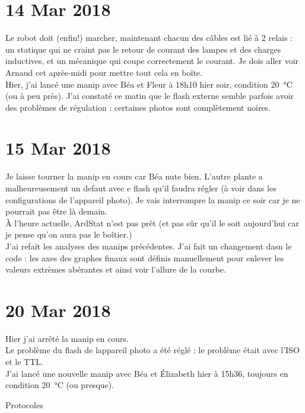 \documentclass[10pt,a4paper]{article}
\begin{document}
\section{14 Mar 2018}
Le robot doit (enfin!) marcher, maintenant chacun des câbles est lié à 2 relais : un statique qui ne craint pas le retour de courant des lampes et des charges inductives, et un mécanique qui coupe correctement le courant. Je dois aller voir Arnaud cet après-midi pour mettre tout cela en boîte.\\

Hier, j'ai lancé une manip avec Béa et Fleur à 18h10 hier soir, condition \SI{20}{\celsius} (ou à peu près). J'ai constaté ce matin que le flash externe semble parfois avoir des problèmes de régulation : certaines photos sont complètement noires.

\section{15 Mar 2018}
Je laisse tourner la manip en cours car Béa nute bien. L'autre plante a malheureusement un defaut avec e flash qu'il faudra régler (à voir dans les configurations de l'appareil photo). Je vais interrompre la manip ce soir car je ne pourrait pas être là demain.\\

À l'heure actuelle, ArdStat n'est pas prêt (et pas sûr qu'il le soit aujourd'hui car je pense qu'on aura pas le boîtier.)\\

J'ai refait les analyses des manips précédentes. J'ai fait un changement dasn le code : les axes des graphes finaux sont définis manuellement pour enlever les valeurs extrèmes abérantes et ainsi voir l'allure de la courbe.

\section{20 Mar 2018}
Hier j'ai arrêté la manip en cours.\\
Le problème du flash de lappareil photo a été réglé : le problème était avec l'ISO et le TTL.\\

J'ai lancé une nouvelle manip avec Béa et Élizabeth hier à 15h36, toujours en condition \SI{20}{\celsius} (ou presque).



\newpage
\begin{center}
    {\Huge Protocoles}
\end{center}
\appendix
\setcounter{secnumdepth}{1}
\end{document}
